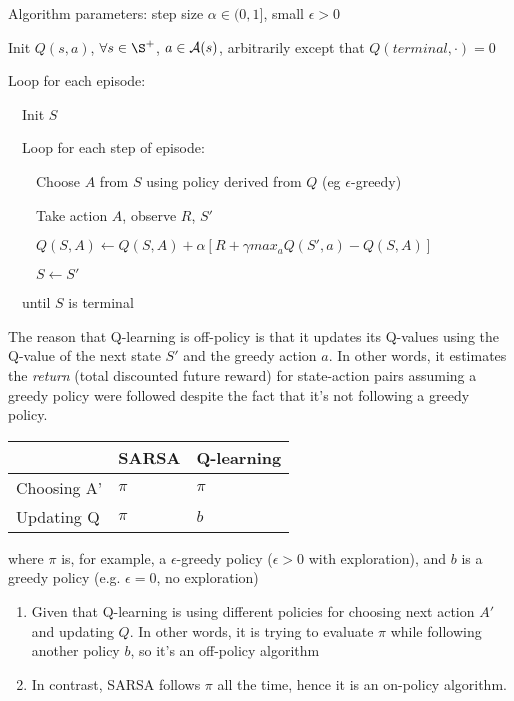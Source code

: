 \documentclass[sutton_barto_notes.tex]{subfiles}
\begin{document}
\begin{tcolorbox}[width=1.1\textwidth,title={Q-learning (off-policy TD control} for estimating $\pi\approx \pi_*$]
Algorithm parameters: step size $\alpha \in (0,1]$, small $\epsilon > 0$

Init $Q(s,a)$, $\forall s \in \S^+$, $a \in \operatorname*{\mathcal{A}}(s)$, arbitrarily except that $Q(terminal,\cdot)=0$

Loop for each episode:

$\quad$Init $S$

$\quad$Loop for each step of episode:

$\quad\quad$Choose $A$ from $S$ using policy derived from $Q$ (eg $\epsilon$-greedy)

$\quad\quad$Take action $A$, observe $R$, $S'$

$\quad\quad Q(S, A) \leftarrow Q(S, A) + \alpha [ R + \gamma max_a Q( S', a) - Q(S, A)]$

$\quad\quad S \leftarrow S'$

$\quad$until $S$ is terminal
\end{tcolorbox}

The reason that Q-learning is off-policy is that it updates its Q-values using the Q-value of the next state $S'$ and the greedy action $a$. In other words, it estimates the \textit{return} (total discounted future reward) for state-action pairs assuming a greedy policy were followed despite the fact that it's not following a greedy policy.


\begin{table}[h!]
\begin{tabular}{lll}
            & SARSA              & Q-learning         \\ \hline
Choosing A' & $\pi$ & $\pi$ \\ \hline
Updating Q  & $\pi$ & $b$    \\ \hline             
\end{tabular}
\end{table}
where $\pi$ is, for example, a $\epsilon$-greedy policy ($\epsilon > 0$ with exploration), and $b$ is a greedy policy (e.g. $\epsilon = 0$, no exploration)

\begin{enumerate}
\item Given that Q-learning is using different policies for choosing next action $A'$ and updating $Q$. In other words, it is trying to evaluate $\pi$ while following another policy $b$, so it's an off-policy algorithm
\item In contrast, SARSA follows $\pi$ all the time, hence it is an on-policy algorithm.
\end{enumerate}
\end{document}
